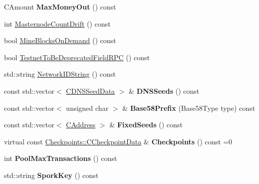 \begin{DoxyCompactItemize}
\item 
\mbox{\label{class_c_chain_params_a82190f02d83daee6823362e3c25848d0}} 
C\+Amount {\bfseries Max\+Money\+Out} () const
\item 
int \mbox{\hyperlink{class_c_chain_params_a9d2e5ae617867ebcb930c65a146b6e5c}{Masternode\+Count\+Drift}} () const
\item 
bool \mbox{\hyperlink{class_c_chain_params_a96be31ff3d8525c9d5458b7d07ada6bb}{Mine\+Blocks\+On\+Demand}} () const
\item 
bool \mbox{\hyperlink{class_c_chain_params_a1552cea0636112ef84069cd6b7858b8e}{Testnet\+To\+Be\+Deprecated\+Field\+R\+PC}} () const
\item 
std\+::string \mbox{\hyperlink{class_c_chain_params_a2c02cc73f7fe9369cee9a39a0fd5b710}{Network\+I\+D\+String}} () const
\item 
\mbox{\label{class_c_chain_params_a402b8df138b265619217ddf934bbc67a}} 
const std\+::vector$<$ \mbox{\hyperlink{struct_c_d_n_s_seed_data}{C\+D\+N\+S\+Seed\+Data}} $>$ \& {\bfseries D\+N\+S\+Seeds} () const
\item 
\mbox{\label{class_c_chain_params_a103c58eca4a26a71201882b3ed6c4cb4}} 
const std\+::vector$<$ unsigned char $>$ \& {\bfseries Base58\+Prefix} (Base58\+Type type) const
\item 
\mbox{\label{class_c_chain_params_a3bd33f38910c2a7b435a71d270515b54}} 
const std\+::vector$<$ \mbox{\hyperlink{class_c_address}{C\+Address}} $>$ \& {\bfseries Fixed\+Seeds} () const
\item 
\mbox{\label{class_c_chain_params_aba314e7660492aee43812344fa796d6c}} 
virtual const \mbox{\hyperlink{struct_checkpoints_1_1_c_checkpoint_data}{Checkpoints\+::\+C\+Checkpoint\+Data}} \& {\bfseries Checkpoints} () const =0
\item 
\mbox{\label{class_c_chain_params_a128aaa94e4cfcba19dc26e6d2f5ad467}} 
int {\bfseries Pool\+Max\+Transactions} () const
\item 
\mbox{\label{class_c_chain_params_a8ad2fa7772a2d4fe430e6b933003a2c7}} 
std\+::string {\bfseries Spork\+Key} () const

\end{DoxyCompactItemize}
